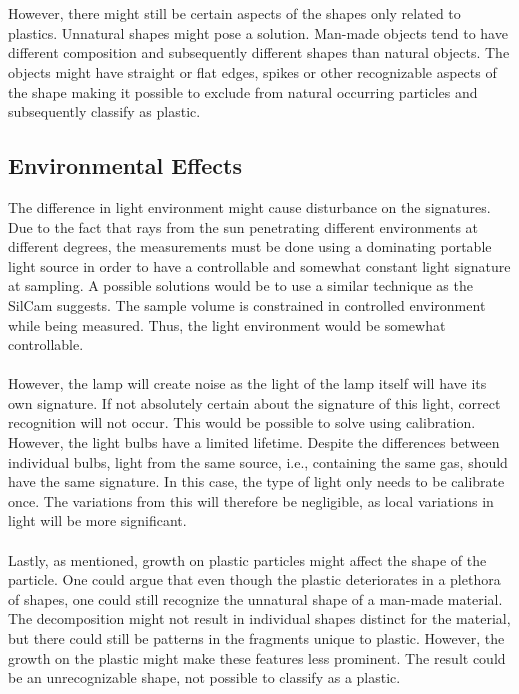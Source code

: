 \\\\
However, there might still be certain aspects of the shapes only related to plastics. Unnatural shapes might pose a solution. Man-made objects tend to have different composition and subsequently different shapes than natural objects. The objects might have straight or flat edges, spikes or other recognizable aspects of the shape making it possible to exclude from natural occurring particles and subsequently classify as plastic.

\subsection{Environmental Effects}
The difference in light environment might cause disturbance on the signatures. Due to the fact that rays from the sun penetrating different environments at different degrees, the measurements must be done using a dominating portable light source in order to have a controllable and somewhat constant light signature at sampling. A possible solutions would be to use a similar technique as the SilCam suggests. The sample volume is constrained in controlled environment while being measured. Thus, the light environment would be somewhat controllable. 
\\\\
However, the lamp will create noise as the light of the lamp itself will have its own signature. If not absolutely certain about the signature of this light, correct recognition will not occur. This would be possible to solve using calibration. However, the light bulbs have a limited lifetime. Despite the differences between individual bulbs, light from the same source, i.e., containing the same gas, should have the same signature. In this case, the type of light only needs to be calibrate once. The variations from this will therefore be negligible, as local variations in light will be more significant. 
\\\\
Lastly, as mentioned, growth on plastic particles might affect the shape of the particle. One could argue that even though the plastic deteriorates in a plethora of shapes, one could still recognize the unnatural shape of a man-made material. The decomposition might not result in individual shapes distinct for the material, but there could still be patterns in the fragments unique to plastic. However, the growth on the plastic might make these features less prominent. The result could be an unrecognizable shape, not possible to classify as a plastic. 